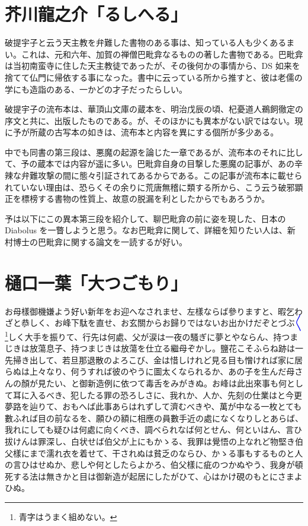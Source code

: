 \documentclass{ujarticle}
\begin{document}
\section{芥川龍之介「るしへる」}

破提宇子と云う天主教を弁難した書物のある事は、知っている人も少くあるまい。これは、元和六年、加賀の禅僧巴毗弇なるものの著した書物である。巴毗弇は当初南蛮寺に住した天主教徒であったが、その後何かの事情から、DS 如来を捨てて仏門に帰依する事になった。書中に云っている所から推すと、彼は老儒の学にも造詣のある、一かどの才子だったらしい。

破提宇子の流布本は、華頂山文庫の蔵本を、明治戊辰の頃、杞憂道人鵜飼徹定の序文と共に、出版したものである。が、そのほかにも異本がない訳ではない。現に予が所蔵の古写本の如きは、流布本と内容を異にする個所が多少ある。

中でも同書の第三段は、悪魔の起源を論じた一章であるが、流布本のそれに比して、予の蔵本では内容が遥に多い。巴毗弇自身の目撃した悪魔の記事が、あの辛辣な弁難攻撃の間に態々引証されてあるからである。この記事が流布本に載せられていない理由は、恐らくその余りに荒唐無稽に類する所から、こう云う破邪顕正を標榜する書物の性質上、故意の脱漏を利としたからでもあろうか。

予は以下にこの異本第三段を紹介して、聊巴毗弇の前に姿を現した、日本の Diabolus を一瞥しようと思う。なお巴毗弇に関して、詳細を知りたい人は、新村博士の巴毗弇に関する論文を一読するが好い。


\section{樋口一葉「大つごもり」}

お母樣御機嫌よう好い新年をお迎へなされませ、左樣ならば參りますと、暇乞わざと恭しく、お峰下駄を直せ、お玄關からお歸りではないお出かけだぞとづぶ\textcolor{blue}{〳〵}\footnote{青字はうまく組めない。}しく大手を振りて、行先は何處、父が涙は一夜の騷ぎに夢とやならん、持つまじきは放蕩息子、持つまじきは放蕩を仕立る繼母ぞかし。鹽花こそふらね跡は一先掃き出して、若旦那退散のよろこび、金は惜しけれど見る目も憎ければ家に居らぬは上々なり、何うすれば彼のやうに圖太くなられるか、あの子を生んだ母さんの顏が見たい、と御新造例に依つて毒舌をみがきぬ。お峰は此出來事も何として耳に入るべき、犯したる罪の恐ろしさに、我れか、人か、先刻の仕業はと今更夢路を辿りて、おもへば此事あらはれずして濟むべきや、萬が中なる一枚とても數ふれば目の前なるを、願ひの額に相應の員數手近の處になくなりしとあらば、我れにしても疑ひは何處に向くべき、調べられなば何とせん、何といはん、言ひ拔けんは罪深し、白状せば伯父が上にもかゝる、我罪は覺悟の上なれど物堅き伯父樣にまで濡れ衣を着せて、干されぬは貧乏のならひ、かゝる事もするものと人の言ひはせぬか、悲しや何としたらよかろ、伯父樣に疵のつかぬやう、我身が頓死する法は無きかと目は御新造が起居にしたがひて、心はかけ硯のもとにさまよひぬ。
\end{document}
